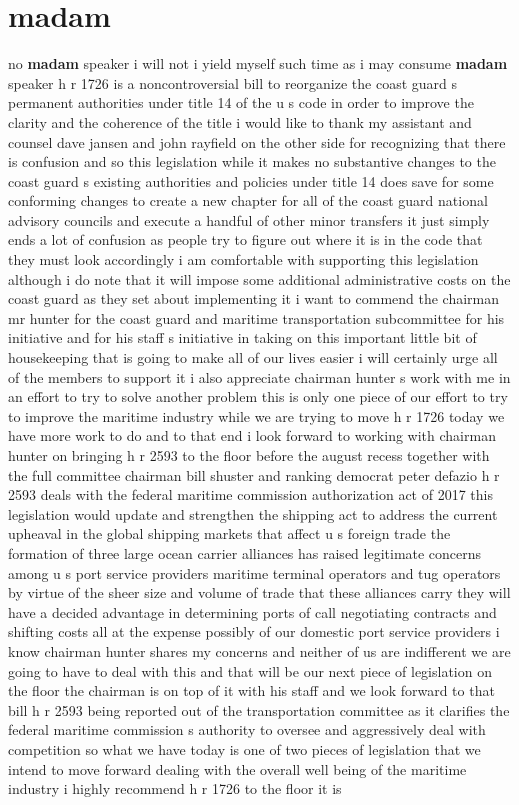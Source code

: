 \documentclass{article}
\begin{document}
\section*{madam}
no {\bf \color{red} madam} speaker i will not
\vspace{8mm}
i yield myself such time as i may consume {\bf \color{red} madam} speaker h r 1726 is a noncontroversial bill to reorganize the coast guard s permanent authorities under title 14 of the u s code in order to improve the clarity and the coherence of the title i would like to thank my assistant and counsel dave jansen and john rayfield on the other side for recognizing that there is confusion and so this legislation while it makes no substantive changes to the coast guard s existing authorities and policies under title 14 does save for some conforming changes to create a new chapter for all of the coast guard national advisory councils and execute a handful of other minor transfers it just simply ends a lot of confusion as people try to figure out where it is in the code that they must look accordingly i am comfortable with supporting this legislation although i do note that it will impose some additional administrative costs on the coast guard as they set about implementing it i want to commend the chairman mr hunter for the coast guard and maritime transportation subcommittee for his initiative and for his staff s initiative in taking on this important little bit of housekeeping that is going to make all of our lives easier i will certainly urge all of the members to support it i also appreciate chairman hunter s work with me in an effort to try to solve another problem this is only one piece of our effort to try to improve the maritime industry while we are trying to move h r 1726 today we have more work to do and to that end i look forward to working with chairman hunter on bringing h r 2593 to the floor before the august recess together with the full committee chairman bill shuster and ranking democrat peter defazio h r 2593 deals with the federal maritime commission authorization act of 2017 this legislation would update and strengthen the shipping act to address the current upheaval in the global shipping markets that affect u s foreign trade the formation of three large ocean carrier alliances has raised legitimate concerns among u s port service providers maritime terminal operators and tug operators by virtue of the sheer size and volume of trade that these alliances carry they will have a decided advantage in determining ports of call negotiating contracts and shifting costs all at the expense possibly of our domestic port service providers i know chairman hunter shares my concerns and neither of us are indifferent we are going to have to deal with this and that will be our next piece of legislation on the floor the chairman is on top of it with his staff and we look forward to that bill h r 2593 being reported out of the transportation committee as it clarifies the federal maritime commission s authority to oversee and aggressively deal with competition so what we have today is one of two pieces of legislation that we intend to move forward dealing with the overall well being of the maritime industry i highly recommend h r 1726 to the floor it is 
\end{document}
